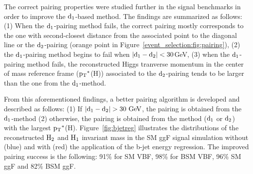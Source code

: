 The correct pairing properties were studied further in the signal benchmarks in order to improve the $\mathrm{d_{1}}$-based method. The findings are summarized as follows: (1) When the $\mathrm{d_{1}}$-pairing method fails, the correct pairing mostly corresponds to the one with second-closest distance from the associated point to the diagonal line or the $\mathrm{d_{2}}$-pairing (orange point in Figure~\ref{event_selection:fig:pairing}), (2) the $\mathrm{d_{1}}$-pairing method begins to fail when $|\mathrm{d_{1}}-\mathrm{d_{2}}|<30$GeV, (3) when the $\mathrm{d_{1}}$-pairing method fails, the reconstructed Higgs tranverse momentum in the center of mass reference frame ($\mathrm{p_{T}}^{*}$(H)) associated to the $\mathrm{d_{2}}$-pairing tends to be larger than the one from the $\mathrm{d_{1}}$-method. 


From this aforementioned findings, a better pairing algorithm is developed and described as follows: (1) If $\mathrm{|\dhhfst-\dhhsnd|>30~GeV}$, the pairing is obtained from the $\mathrm{d_{1}}$-method (2) otherwise, the pairing is obtained from the method ($\mathrm{d_{1}}$ or $\mathrm{d_{2}}$) with the largest $\mathrm{p_{T}}^{*}$(H). Figure~\ref{fig:bjetreg} illustrates the distributions of the reconstructed $\mathrm{H_{2}}$ and $\mathrm{H_{1}}$ invariant mass in the SM ggF signal simulation without (blue) and with (red) the application of the b-jet energy regression. The improved pairing success is the following: 91\% for SM VBF, 98\% for BSM VBF, 96\% SM ggF and 82\% BSM ggF. %

